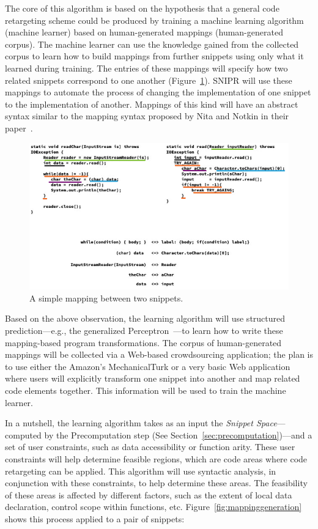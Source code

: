 The core of this algorithm is based on the hypothesis that a general code retargeting scheme could be produced by training a machine learning algorithm (machine learner) based on human-generated mappings (human-generated corpus). The machine learner can use the knowledge gained from the collected corpus to learn how to build mappings from further snippets using only what it learned during training. The entries of these mappings will specify how two related snippets correspond to one another (Figure~\ref{fig:mappings}). SNIPR will use these mappings to automate the process of changing the implementation of one snippet to the implementation of another. Mappings of this kind will have an abstract syntax similar to the mapping syntax proposed by Nita and Notkin in their paper~\cite{Nita:2010en}.

\begin{figure}[!ht]
    \centering
    \includegraphics[width=\textwidth]{images/mappings}
    \caption{A simple mapping between two snippets.}
    \label{fig:mappings}
\end{figure}

Based on the above observation, the learning algorithm will use structured prediction---e.g., the generalized Perceptron~\cite{Collins:2002uo}---to learn how to write these mapping-based program transformations. The corpus of human-generated mappings will be collected via a Web-based crowdsourcing application; the plan is to use either the Amazon's MechanicalTurk or a very basic Web application where users will explicitly transform one snippet into another and map related code elements together. This information will be used to train the machine learner.

In a nutshell, the learning algorithm takes as an input the \emph{Snippet Space}---computed by the Precomputation step (See Section~\ref{sec:precomputation})---and a set of user constraints, such as data accessibility or function arity. These user constraints will help determine feasible regions, which are code areas where code retargeting can be applied. This algorithm will use syntactic analysis, in conjunction with these constraints, to help determine these areas. The feasibility of these areas is affected by different factors, such as the extent of local data declaration, control scope within functions, etc. Figure~\ref{fig:mappinggeneration} shows this process applied to a pair of snippets:

